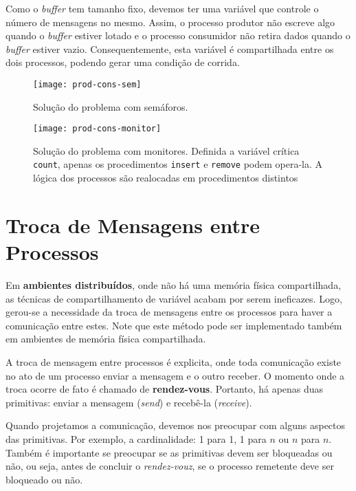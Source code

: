 Como o \textit{buffer} tem tamanho fixo, devemos ter uma variável que controle o número de mensagens no mesmo. Assim, o processo produtor não escreve algo quando o \textit{buffer} estiver lotado e o processo consumidor não retira dados quando o \textit{buffer} estiver vazio. Consequentemente, esta variável é compartilhada entre os dois processos, podendo gerar uma condição de corrida.

\begin{figure}[ht]
  \texttt{[image: prod-cons-sem]}
  \caption{Solução do problema com semáforos.}
  \label{fig:prod-cons-sem}
\end{figure}


\begin{figure}[!ht]
  \texttt{[image: prod-cons-monitor]}
  \caption{Solução do problema com monitores. Definida a variável crítica \texttt{count}, apenas os procedimentos \texttt{insert} e \texttt{remove} podem opera-la. A lógica dos processos são realocadas em procedimentos distintos}
  \label{fig:prod-cons-monitor}
\end{figure}









\section{Troca de Mensagens entre Processos}
Em \textbf{ambientes distribuídos}, onde não há uma memória física compartilhada, as técnicas de compartilhamento de variável acabam por serem ineficazes. Logo, gerou-se a necessidade da troca de mensagens entre os processos para haver a comunicação entre estes. Note que este método pode ser implementado também em ambientes de memória física compartilhada.

A troca de mensagem entre processos é explicita, onde toda comunicação existe no ato de um processo enviar a mensagem e o outro receber. O momento onde a troca ocorre de fato é chamado de \textbf{rendez-vous}. Portanto, há apenas duas primitivas: enviar a mensagem (\textit{send}) e recebê-la (\textit{receive}).

Quando projetamos a comunicação, devemos nos preocupar com alguns aspectos das primitivas. Por exemplo, a cardinalidade: 1 para 1, 1 para $n$ ou $n$ para $n$. Também é importante se preocupar se as primitivas devem ser bloqueadas ou não, ou seja, antes de concluir o \textit{rendez-vouz}, se o processo remetente deve ser bloqueado ou não.

